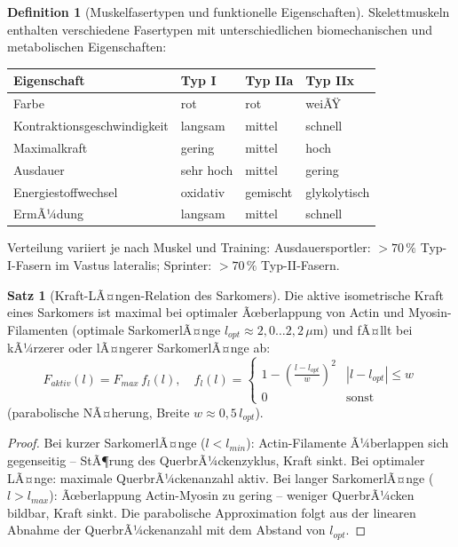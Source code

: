 ﻿\documentclass[a4paper,12pt]{report}
\theoremstyle{definition}
\newtheorem{definition}{Definition}
\newtheorem{satz}{Satz}
\begin{document}
\begin{definition}[Muskelfasertypen und funktionelle Eigenschaften]
Skelettmuskeln enthalten verschiedene Fasertypen mit unterschiedlichen
biomechanischen und metabolischen Eigenschaften:
\begin{center}
\begin{tabular}{llll}
\toprule
Eigenschaft & Typ I & Typ IIa & Typ IIx \\
\midrule
Farbe & rot & rot & weiÃŸ \\
Kontraktionsgeschwindigkeit & langsam & mittel & schnell \\
Maximalkraft & gering & mittel & hoch \\
Ausdauer & sehr hoch & mittel & gering \\
Energiestoffwechsel & oxidativ & gemischt & glykolytisch \\
ErmÃ¼dung & langsam & mittel & schnell \\
\bottomrule
\end{tabular}
\end{center}
Verteilung variiert je nach Muskel und Training:
Ausdauersportler: $> 70\,\%$ Typ-I-Fasern im Vastus lateralis;
Sprinter: $> 70\,\%$ Typ-II-Fasern.
\end{definition}

\begin{satz}[Kraft-LÃ¤ngen-Relation des Sarkomers]
Die aktive isometrische Kraft eines Sarkomers ist maximal bei optimaler
Ãœberlappung von Actin und Myosin-Filamenten (optimale SarkomerlÃ¤nge
$l_{opt} \approx 2{,}0\ldots2{,}2\,\mu\mathrm{m}$) und fÃ¤llt bei kÃ¼rzerer
oder lÃ¤ngerer SarkomerlÃ¤nge ab:
\[
  F_{aktiv}(l) = F_{max}\,f_l(l), \quad
  f_l(l) = \begin{cases}
    1 - \left(\frac{l-l_{opt}}{w}\right)^2 & |l-l_{opt}| \le w \\
    0 & \text{sonst}
  \end{cases}
\]
(parabolische NÃ¤herung, Breite $w \approx 0{,}5\,l_{opt}$).
\end{satz}
\begin{proof}
Bei kurzer SarkomerlÃ¤nge ($l < l_{min}$): Actin-Filamente Ã¼berlappen
sich gegenseitig -- StÃ¶rung des QuerbrÃ¼ckenzyklus, Kraft sinkt.
Bei optimaler LÃ¤nge: maximale QuerbrÃ¼ckenanzahl aktiv.
Bei langer SarkomerlÃ¤nge ($l > l_{max}$): Ãœberlappung Actin-Myosin zu gering --
weniger QuerbrÃ¼cken bildbar, Kraft sinkt. Die parabolische Approximation
folgt aus der linearen Abnahme der QuerbrÃ¼ckenanzahl mit dem Abstand von $l_{opt}$.
\end{proof}
\end{document}
